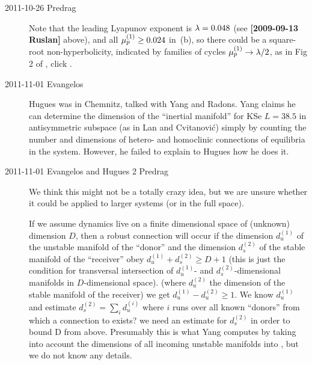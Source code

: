 \begin{description}
\item[2011-10-26 Predrag] Note that the leading Lyapunov exponent is
  $\lambda = 0.048$ (see {\bf [2009-09-13 Ruslan]} above), and all
  $\eigRe[1]_p \geq 0.024$ in \,(b), so there
  could be a square-root non-hyperbolicity, indicated by families of cycles
  $\eigRe[1]_p \to \Lyap/2$, as in Fig 2  of , click
  .

\item[2011-11-01 Evangelos] Hugues was in Chemnitz, talked with Yang and Radons.
  Yang claims he can determine the dimension of the ``inertial manifold'' for
  KSe $L=38.5$ in antisymmetric subspace (as in Lan and Cvitanovi\'c)
  simply by counting the number and dimensions of hetero- and homoclinic connections of
  equilibria in the system. However, he failed to explain to Hugues how he does it.

\item[2011-11-01 Evangelos and Hugues 2 Predrag] We think this might not be a totally
  crazy idea, but we are unsure whether it could be applied to larger systems (or in the
  full space).

  If we assume dynamics live on a finite dimensional space of (unknown)
  dimension $D$, then a robust connection will occur if the dimension
  $d_u^{(1)}$ of the unstable manifold of the ``donor''  and the
  dimension $d_s^{(2)}$ of the stable manifold of the ``receiver''  
  obey $d_u^{(1)}+d_s^{(2)} \geq D+1$ (this is just the condition for
  transversal intersection of $d_u^{(1)}$- and $d_s^{(2)}$-dimensional
  manifolds in $D$-dimensional space). %
  (where $d_u^{(2)}$ the dimension of the stable manifold of the receiver)
  we get $d_u^{(1)}-d_u^{(2)}\geq1$. We know $d_u^{(1)}$ and %
  estimate $d_s^{(2)}=\sum_i d_u^{(i)}$ where $i$ runs over all known %
  ``donors'' from which a connection to  exists? we need an estimate
  for  $d_s^{(2)}$ in order to bound D from above. Presumably this is what
  Yang computes by taking into account the dimensions of all incoming
  unstable manifolds into , but we do not know any details.


\end{description}

